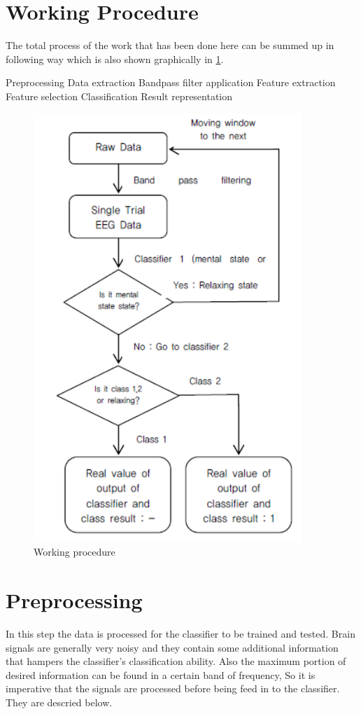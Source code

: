 \documentclass[12pt,a4paper]{report}
\begin{document}
	\section{Working Procedure}
The total process of the work that has been done here can be summed up in following way which is also shown graphically in \ref{Fig diagram}.
\begin{outline}
	\1 Preprocessing
	\2 Data extraction
	\3 Bandpass filter application
	\2 Feature extraction
	\2 Feature selection
	\1 Classification
	\1 Result representation
\end{outline} 
\begin{figure}[h]
	\centering 
	\includegraphics[width=4in]{method.png}
	\caption{ Working procedure }
	\label{Fig diagram}  
\end{figure}							
\section{Preprocessing}
\justify In this step the data is processed for the classifier to be trained and tested. Brain signals are generally very noisy and they contain some additional information that hampers the classifier's classification ability. Also the maximum portion of desired information can be found in a certain band of frequency, So it is imperative that the signals are processed before being feed in to the classifier.
\justify They are descried below.
\end{document}
